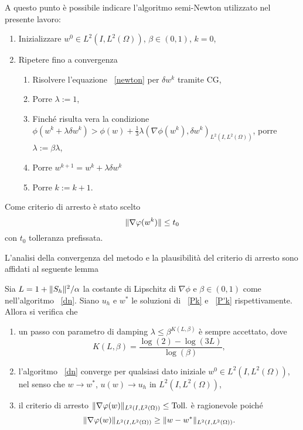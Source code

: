A questo punto è possibile indicare l'algoritmo semi-Newton utilizzato nel presente lavoro:
\begin{algoritmo}
\label{dn}
\begin{enumerate}
\item Inizializzare $ w^0\in L^2(I,L^2(\Omega)) $, $\beta\in(0,1) $, $ k=0 $, 
\item Ripetere fino a convergenza
          \begin{enumerate}
          \item Risolvere l'equazione ~\eqref{newton} per $ \delta w^k $ tramite CG,
          \item Porre $ \lambda:=1 $,
          \item Finché risulta vera la condizione $ \phi(w^k+\lambda\delta w^k) > \phi(w) + \frac{1}{3}\lambda(\nabla\phi(w^k),\delta w^k)_{L^2(I,L^2(\Omega))} $, porre $ \lambda:=\beta\lambda $,
          \item Porre $ w^{k+1}=w^k + \lambda\delta w^k $
         \item Porre $ k:=k+1 $.
          \end{enumerate}
\end{enumerate}
Come criterio di arresto è stato scelto 
\begin{equation}
\lVert\nabla\varphi(w^k)\rVert\le t_0
\label{eq:DNtoll}
\end{equation}
con $ t_0 $ tolleranza prefissata.          
\label{DN}
\end{algoritmo}
L'analisi della convergenza del metodo e la plausibilità del criterio di arresto sono affidati al seguente lemma
\begin{lemma}
\label{global}
Sia $ L=1+\lVert S_h\rVert^2 /\alpha $ la costante di Lipschitz di $ \nabla\phi $ e $ \beta\in(0,1) $ come nell'algoritmo  ~\eqref{dn}. Siano $ u_h $ e $ w^* $ le soluzioni di ~\eqref{Pk} e ~\eqref{P'k} rispettivamente. Allora si verifica che 
\begin{enumerate}
\item un passo con parametro di damping $ \lambda\le\beta^{K(L,\beta)} $ è sempre accettato, dove
\begin{equation}
K(L,\beta)=\frac{\log(2)-\log(3L)}{\log(\beta)},
\end{equation}
\item l'algoritmo ~\eqref{dn} converge per qualsiasi dato iniziale $ w^0\in L^2(I,L^2(\Omega)) $, nel senso che $ w\to w^* $, $ u(w)\to u_h $ in $ L^2(I,L^2(\Omega)) $,
\item il criterio di arresto $ \lVert\nabla\varphi(w)\rVert_{L^2(I,L^2(\Omega))}\le\text{Toll.} $ è ragionevole poiché
\begin{equation}
\lVert\nabla\varphi(w)\rVert_{L^2(I,L^2(\Omega))}\ge \lVert w-w^*\rVert_{L^2(I,L^2(\Omega))}.
\end{equation}
\end{enumerate}
\end{lemma} 


